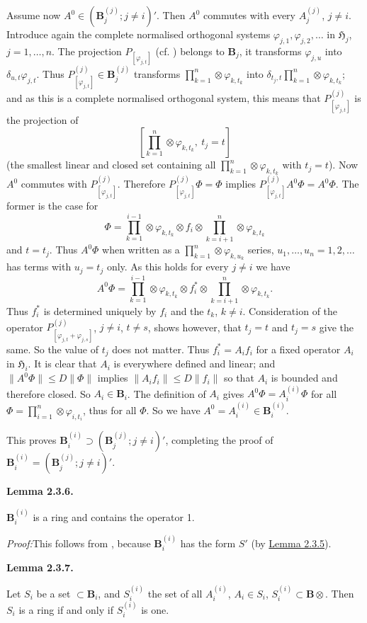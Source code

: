 \documentclass[12pt,b5paper,twoside]{article}
\newcommand{\Hspace}{\mathfrak H}
\newcommand{\B}{\mathbf B}
\newcommand{\Lemma}[1]{%
  \par\smallskip\noindent\phantomsection\label{lem:#1}\textbf{Lemma #1.}\enspace
}
\newcommand{\Proof}{\par\noindent\textit{Proof:}\enspace}
\newcommand{\lemref}[1]{\hyperref[lem:#1]{Lemma #1}}
\begin{document}
Assume now $A^0\in(\B_j^{(j)}; j\ne i)'$. Then $A^0$ commutes with every
$A_j^{(j)}$, $j\ne i$. Introduce again the complete normalised orthogonal
systems $\varphi_{j,1},\varphi_{j,2},\ldots$ in $\Hspace_j$,
$j=1,\ldots,n$. The projection $P_{[\varphi_{j,t}]}$ (cf.
\cite[p.~74]{ref16}) belongs to $\B_j$, it transforms $\varphi_{j,u}$ into
$\delta_{u,t}\varphi_{j,t}$. Thus $P_{[\varphi_{j,t}]}^{(j)}\in\B_j^{(j)}$
transforms $\prod_{k=1}^{n}\otimes\varphi_{k,t_k}$ into
$\delta_{t_j,t}\prod_{k=1}^{n}\otimes\varphi_{k,t_k}$; and as this is a
complete normalised orthogonal system, this means that
$P_{[\varphi_{j,t}]}^{(j)}$ is the projection of
\[
 \left[\prod_{k=1}^{n}\otimes\varphi_{k,t_k},\ t_j=t\right]
\]
(the smallest linear and closed set containing all
$\prod_{k=1}^{n}\otimes\varphi_{k,t_k}$ with $t_j=t$). Now $A^0$ commutes
with $P_{[\varphi_{j,t}]}^{(j)}$. Therefore
$P_{[\varphi_{j,t}]}^{(j)}\Phi=\Phi$ implies
$P_{[\varphi_{j,t}]}^{(j)}A^0\Phi=A^0\Phi$. The former is the case for
\[
 \Phi=\prod_{k=1}^{i-1}\otimes\varphi_{k,t_k}\otimes f_i\otimes
      \prod_{k=i+1}^{n}\otimes\varphi_{k,t_k}
\]
and $t=t_j$. Thus $A^0\Phi$ when written as a
$\prod_{k=1}^{n}\otimes\varphi_{k,u_k}$ series,
$u_1,\ldots,u_n=1,2,\ldots$ has terms with $u_j=t_j$ only. As this holds for
every $j\ne i$ we have
\[
 A^0\Phi=\prod_{k=1}^{i-1}\otimes\varphi_{k,t_k}\otimes f_i^*\otimes
           \prod_{k=i+1}^{n}\otimes\varphi_{k,t_k}.
\]
Thus $f_i^*$ is determined uniquely by $f_i$ and the $t_k$, $k\ne i$.
Consideration of the operator
$P_{[\varphi_{j,t}+\varphi_{j,s}]}^{(j)}$, $j\ne i$, $t\ne s$, shows however,
that $t_j=t$ and $t_j=s$ give the same. So the value of $t_j$ does not
matter. Thus $f_i^*=A_if_i$ for a fixed operator $A_i$ in $\Hspace_i$. It is
clear that $A_i$ is everywhere defined and linear; and
$\lVert A^0\Phi\rVert\leq D\lVert\Phi\rVert$ implies
$\lVert A_if_i\rVert\leq D\lVert f_i\rVert$ so that $A_i$ is bounded and
therefore closed. So $A_i\in\B_i$. The definition of $A_i$ gives
$A^0\Phi=A_i^{(i)}\Phi$ for all
$\Phi=\prod_{i=1}^{n}\otimes\varphi_{i,t_i}$, thus for all $\Phi$. So we
have $A^0=A_i^{(i)}\in\B_i^{(i)}$.

This proves $\B_i^{(i)}\supset(\B_j^{(j)}; j\ne i)'$, completing the proof
of $\B_i^{(i)}=(\B_j^{(j)}; j\ne i)'$.

\Lemma{2.3.6}
$\B_i^{(i)}$ is a ring and contains the operator 1.

\Proof This follows from \cite[p.~397]{ref18}, because $\B_i^{(i)}$ has the
form $S'$ (by \lemref{2.3.5}).

\Lemma{2.3.7}
Let $S_i$ be a set $\subset\B_i$, and $S_i^{(i)}$ the set of all
$A_i^{(i)}$, $A_i\in S_i$, $S_i^{(i)}\subset\B\otimes$. Then $S_i$ is a
ring if and only if $S_i^{(i)}$ is one.
\end{document}
